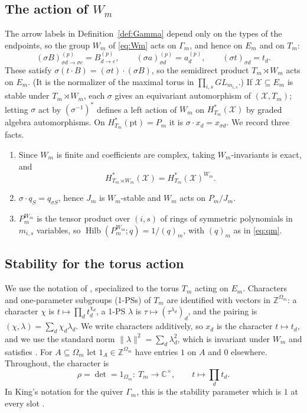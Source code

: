 \documentclass[11pt]{amsart}
\theoremstyle{definition}
\theoremstyle{remark}
\numberwithin{equation}{section}
\newcommand{\C}{\mathbb{C}}
\newcommand{\Z}{\mathbb{Z}}
\newcommand{\cX}{\mathcal{X}}
\newcommand{\Om}{\Omega_m}
\newcommand{\norm}[1]{\lVert #1\rVert}
\DeclareMathOperator{\Hilb}{Hilb}
\begin{document}
\subsection{The action of \texorpdfstring{$W_m$}{W\_m}}\label{subsec:Wm}
The arrow labels in Definition~\ref{def:Gamma} depend only on the types of the endpoints, so the group
$W_m$ of \eqref{eq:Wm} acts on $\Gamma_m$, and hence on $E_m$ and on $T_m$:
\[
  (\sigma B)^{(p)}_{\sigma d\to\sigma e}=B^{(p)}_{d\to e},\qquad (\sigma a)^{(p)}_{\sigma d}=a^{(p)}_d,\qquad
  (\sigma t)_{\sigma d}=t_d .
\]
These satisfy $\sigma(t\cdot B)=(\sigma t)\cdot(\sigma B)$, so the semidirect product $T_m\rtimes W_m$
acts on $E_m$. (It is the normalizer of the maximal torus in $\prod_{i,s}GL_{m_{i,s}}$.) If
$\cX\subseteq E_m$ is stable under $T_m\rtimes W_m$, each $\sigma$ gives an equivariant automorphism of
$(\cX,T_m)$; letting $\sigma$ act by $(\sigma^{-1})^*$ defines a left action of $W_m$ on $H^*_{T_m}(\cX)$
by graded algebra automorphisms. On $H^*_{T_m}(\mathrm{pt})=P_m$ it is $\sigma\cdot x_d=x_{\sigma d}$. We
record three facts.
\begin{enumerate}[label=(\alph*),leftmargin=2em]
\item\label{fact:inv} Since $W_m$ is finite and coefficients are complex, taking $W_m$-invariants is
exact, and
\[
  H^*_{T_m\rtimes W_m}(\cX)=H^*_{T_m}(\cX)^{W_m}.
\]
\item\label{fact:J} $\sigma\cdot q_S=q_{\sigma S}$, hence $J_m$ is $W_m$-stable and $W_m$ acts on
$P_m/J_m$.
\item\label{fact:qm} $P_m^{W_m}$ is the tensor product over $(i,s)$ of rings of symmetric polynomials in
$m_{i,s}$ variables, so $\Hilb(P_m^{W_m};q)=1/(q)_m$, with $(q)_m$ as in \eqref{eq:qm}.
\end{enumerate}

\subsection{Stability for the torus action}\label{subsec:stab}
We use the notation of \cite[\S2]{Hos}, specialized to the torus $T_m$ acting on $E_m$. Characters and
one-parameter subgroups (1-PSs) of $T_m$ are identified with vectors in $\Z^{\Om}$: a character $\chi$
is $t\mapsto\prod_dt_d^{\chi_d}$, a 1-PS $\lambda$ is $\tau\mapsto(\tau^{\lambda_d})_d$, and the pairing
is $(\chi,\lambda)=\sum_d\chi_d\lambda_d$. We write characters additively, so $x_d$ is the character
$t\mapsto t_d$, and we use the standard norm $\norm{\lambda}^2=\sum_d\lambda_d^2$, which is invariant
under $W_m$ and satisfies \cite[Assumption~2.9]{Hos}. For $A\subseteq\Om$ let
$1_A\in\Z^{\Om}$ have entries $1$ on $A$ and $0$ elsewhere. Throughout, the character is
\begin{equation}\label{eq:rho}
  \rho=\det=1_{\Om}:\ T_m\to\C^\times,\qquad t\mapsto\prod_dt_d .
\end{equation}
In King's notation for the quiver $\Gamma_m$, this is the stability parameter which is $1$ at every
slot \cite[\S5.1]{Hos}.
\end{document}
